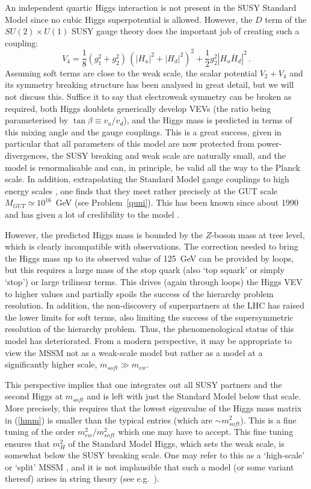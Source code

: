 \documentclass[12pt]{article}
\newcommand{\be}{\begin{equation}}
\newcommand{\ee}{\end{equation}}
\newcommand{\ol}{\overline}
\numberwithin{equation}{section}
\begin{document}
An independent quartic Higgs interaction is not present in the SUSY Standard Model since no cubic Higgs superpotential is allowed. However, the $D$ term of the $SU(2)\times U(1)$ SUSY gauge theory does the important job of creating such a coupling:
\be
V_4= \frac{1}{8}(g_1^2+g_2^2)\,(|H_u|^2+|H_d|^2)^2+\frac{1}{2}g_2^2|H_u \ol{H}_d|^2\,.
\ee
Assuming soft terms are close to the weak scale, the scalar potential $V_2+V_4$ and its symmetry breaking structure has been analysed in great detail, but we will not discuss this. Suffice it to say that electroweak symmetry can be broken as required, both Higgs doublets generically develop VEVs (the ratio being parameterised by $\tan\beta\equiv v_u/v_d$)\index{$\tan\beta$}, and the Higgs mass is predicted in terms of this mixing angle and the gauge couplings. This is a great success, given in particular that all parameters of this model are now protected from power-divergences, the SUSY breaking and weak scale are naturally small, and the model is renormalisable and can, in principle, be valid all the way to the Planck scale. In addition, extrapolating the Standard Model gauge couplings to high energy scales \cite{Dimopoulos:1981yj, Dimopoulos:1981zb, Ibanez:1981yh, Sakai:1981gr}, one finds that they meet rather precisely at the GUT scale $M_{GUT}\simeq 10^{16}$~GeV (see Problem~\ref{quni}). This has been known since about 1990 and has given a lot of credibility to the model \cite{Amaldi:1991cn}.

However, the predicted Higgs mass is bounded by the $Z$-boson mass at tree level, which is clearly incompatible with observations. The correction needed to bring the Higgs mass up to its observed value of 125~GeV can be provided by loops, but this requires a large mass of the stop quark (also `top squark' or simply `stop') or large trilinear terms. This drives (again through loops) the Higgs VEV to higher values and partially spoils the success of the hierarchy problem resolution. In addition, the non-discovery of superpartners at the LHC has raised the lower limits for soft terms, also limiting the success of the supersymmetric resolution of the hierarchy problem. Thus, the phenomenological status of this model has deteriorated. From a modern perspective, it may be appropriate to view the MSSM not as a weak-scale model but rather as a model at a significantly higher scale, $m_{soft}\gg m_{ew}$.

This perspective implies that one integrates out all SUSY partners and the second Higgs at $m_{soft}$ and is left with just the Standard Model below that scale. More precisely, this requires that the lowest eigenvalue of the Higgs mass matrix in (\ref{hmm}) is smaller than the typical entries (which are $\sim m_{soft}^2$). This is a fine tuning of the order $m_{ew}^2/m_{soft}^2$ which one may have to accept. This fine tuning ensures that $m_H^2$ of the Standard Model Higgs, which sets the weak scale, is somewhat below the SUSY breaking scale. One may refer to this as a `high-scale' or `split' MSSM \cite{ArkaniHamed:2004fb, Giudice:2004tc}, and it is not implausible that such a model (or some variant thereof) arises in string theory (see e.g.~\cite{Denef:2004cf, Hebecker:2012qp}).
\end{document}

